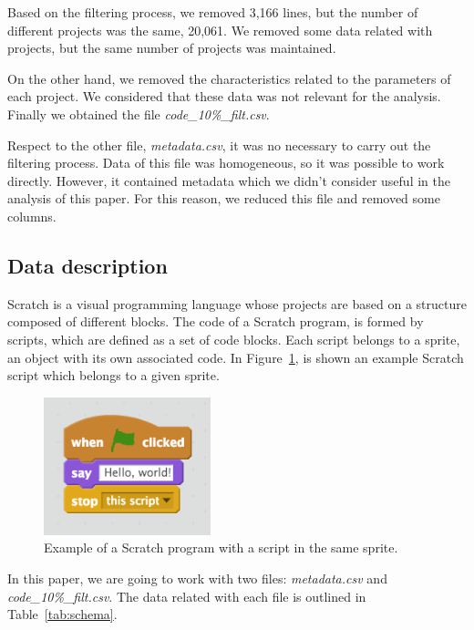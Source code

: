\documentclass[a4paper,twocolumn,10pt]{article}
\begin{document}
Based on the filtering process, we removed 3,166 lines, but the number of
different projects was the same, 20,061. We removed some data related with
projects, but the same number of projects was maintained.

On the other hand, we removed the characteristics related to the
parameters of each project. We considered that these data was not relevant
for the analysis. Finally we obtained the file \textit{code\_10\%\_filt.csv}.

Respect to the other file, \textit{metadata.csv}, it was no necessary to carry
out the filtering process. Data of this file was homogeneous, so it was
possible to work directly. However, it contained metadata which we didn't
consider useful in the analysis of this paper. For this reason, we reduced
this file and removed some columns.

\subsection{Data description}
\label{subsec:description}

Scratch is a visual programming language whose projects are based on a structure
composed of different blocks. The code of a Scratch program, is formed by scripts,
which are defined as a set of code blocks. Each script belongs to a sprite, an object
with its own associated code. In Figure~\ref{tab:scratch}, is shown an example
Scratch script which belongs to a given sprite.

\begin{figure}
\begin{center}
\includegraphics[height=4cm]{images/scratch.png}
\caption{Example of a Scratch program with a script in the same sprite.}
\label{tab:scratch}
\end{center}
\end{figure}

In this paper, we are going to work with two files:
\textit{metadata.csv} and \textit{code\_10\%\_filt.csv}. 
The data related with each file is outlined in Table~\ref{tab:schema}.
\end{document}
